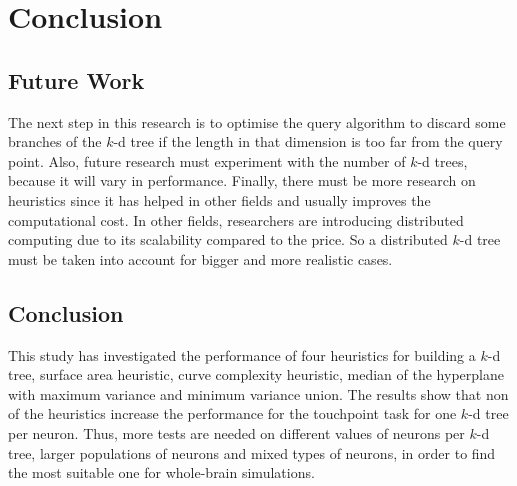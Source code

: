 \chapter{Conclusion}
\label{chapter:conclusion}

\section{Future Work}
The next step in this research is to optimise the query algorithm to discard some branches of the $k$-d tree if the length in that dimension is too far from the query point. Also, future research must experiment with the number of $k$-d trees, because it will vary in performance. Finally, there must be more research on heuristics since it has helped in other fields and usually improves the computational cost. In other fields, researchers are introducing distributed computing due to its scalability compared to the price. So a distributed $k$-d tree must be taken into account for bigger and more realistic cases.

\section{Conclusion}
This study has investigated the performance of four heuristics for building a $k$-d tree, surface area heuristic, curve complexity heuristic, median of the hyperplane with maximum variance and minimum variance union. The results show that non of the heuristics increase the performance for the touchpoint task for one $k$-d tree per neuron. Thus, more tests are needed on different values of neurons per $k$-d tree, larger populations of neurons and mixed types of neurons, in order to find the most suitable one for whole-brain simulations.